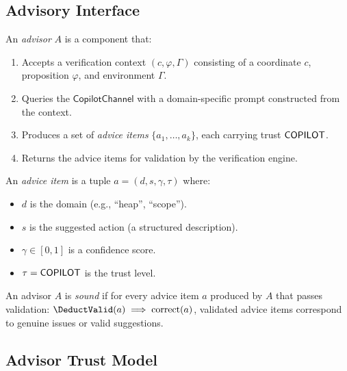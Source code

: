 \documentclass[11pt]{article}
\newcommand{\CopChan}{\mathsf{CopilotChannel}}
\begin{document}
\subsection{Advisory Interface}
\label{sec:pattern:interface}

\begin{definition}[Advisor]
\label{def:advisor}
An \emph{advisor} $A$ is a component that:
\begin{enumerate}
\item Accepts a verification context $(c, \varphi, \Gamma)$
  consisting of a coordinate $c$, proposition $\varphi$, and
  environment $\Gamma$.
\item Queries the $\CopChan$ with a domain-specific prompt
  constructed from the context.
\item Produces a set of \emph{advice items} $\{a_1, \ldots, a_k\}$,
  each carrying trust $\mathsf{COPILOT}$.
\item Returns the advice items for validation by the verification
  engine.
\end{enumerate}
\end{definition}

\begin{definition}
\label{def:advice-item}
An \emph{advice item} is a tuple $a = (d, s, \gamma, \tau)$ where:
\begin{itemize}[leftmargin=2em]
\item $d$ is the domain (e.g., ``heap'', ``scope'').
\item $s$ is the suggested action (a structured description).
\item $\gamma \in [0, 1]$ is a confidence score.
\item $\tau = \mathsf{COPILOT}$ is the trust level.
\end{itemize}
\end{definition}

\begin{definition}
\label{def:adv-sound}
An advisor $A$ is \emph{sound} if for every advice item $a$
produced by $A$ that passes validation:
$\DeductValid(a) \implies \mathrm{correct}(a)$,
\ie validated advice items correspond to genuine issues or
valid suggestions.
\end{definition}

\subsection{Advisor Trust Model}
\label{sec:pattern:trust}
\end{document}
